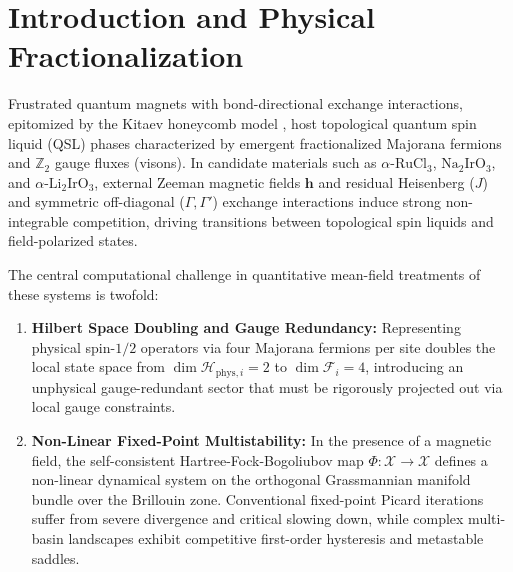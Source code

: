 \section{Introduction and Physical Fractionalization}
\label{sec:intro}

Frustrated quantum magnets with bond-directional exchange interactions, epitomized by the Kitaev honeycomb model \cite{Kitaev2006}, host topological quantum spin liquid (QSL) phases characterized by emergent fractionalized Majorana fermions and $\mathbb{Z}_2$ gauge fluxes (visons). In candidate materials such as $\alpha\text{-RuCl}_3$, $\mathrm{Na}_2\mathrm{IrO}_3$, and $\alpha\text{-Li}_2\mathrm{IrO}_3$, external Zeeman magnetic fields $\mathbf{h}$ and residual Heisenberg ($J$) and symmetric off-diagonal ($\Gamma, \Gamma'$) exchange interactions induce strong non-integrable competition, driving transitions between topological spin liquids and field-polarized states.

The central computational challenge in quantitative mean-field treatments of these systems is twofold:
\begin{enumerate}
\item \textbf{Hilbert Space Doubling and Gauge Redundancy:} Representing physical spin-$1/2$ operators via four Majorana fermions per site doubles the local state space from $\dim \mathcal{H}_{\mathrm{phys}, i} = 2$ to $\dim \mathcal{F}_i = 4$, introducing an unphysical gauge-redundant sector that must be rigorously projected out via local gauge constraints.
\item \textbf{Non-Linear Fixed-Point Multistability:} In the presence of a magnetic field, the self-consistent Hartree-Fock-Bogoliubov map $\Phi: \mathcal{X} \to \mathcal{X}$ defines a non-linear dynamical system on the orthogonal Grassmannian manifold bundle over the Brillouin zone. Conventional fixed-point Picard iterations suffer from severe divergence and critical slowing down, while complex multi-basin landscapes exhibit competitive first-order hysteresis and metastable saddles.
\end{enumerate}

